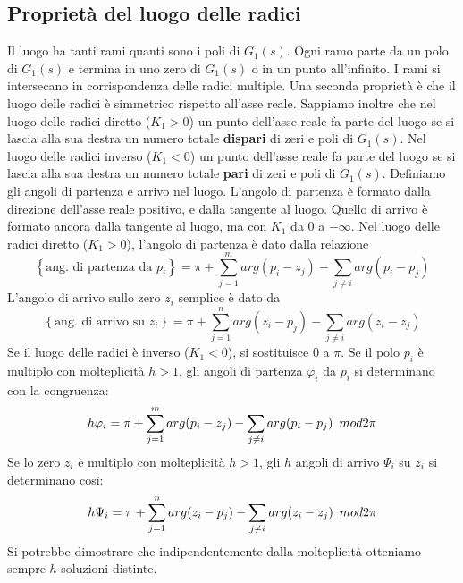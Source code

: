 \documentclass[11pt]{article}
\begin{document}
\subsection{Proprietà del luogo delle radici}
Il luogo ha tanti rami quanti sono i poli di $G_1(s)$. Ogni ramo parte da un polo di $G_1(s)$ e termina in uno zero di $G_1(s)$ o in un punto all'infinito. I rami si intersecano in corrispondenza delle radici multiple.
Una seconda proprietà è che il luogo delle radici è simmetrico rispetto all'asse reale.
Sappiamo inoltre che nel luogo delle radici diretto ($K_1>0$) un punto dell'asse reale fa parte del luogo se si lascia alla sua destra un numero totale \textbf{dispari} di zeri e poli di $G_1(s)$. Nel luogo delle radici inverso ($K_1<0$) un punto dell'asse reale fa parte del luogo se si lascia alla sua destra un numero totale \textbf{pari} di zeri e poli di $G_1(s)$.
Definiamo gli angoli di partenza e arrivo nel luogo. L'angolo di partenza è formato dalla direzione dell'asse reale positivo, e dalla tangente al luogo. Quello di arrivo è formato ancora dalla tangente al luogo, ma con $K_1$ da $0$ a $-\infty$.
Nel luogo delle radici diretto ($K_1>0$), l'angolo di partenza è dato dalla relazione
\begin{displaymath}
    \left\{\textrm{ang. di partenza da }p_i\right\}=\pi+\sum_{j=1}^m arg(p_i-z_j) - \sum_{j\neq i} arg(p_i-p_j)
\end{displaymath}
L'angolo di arrivo sullo zero $z_i$ semplice è dato da
\begin{displaymath}
    \left\{\textrm{ang. di arrivo su }z_i\right\} = \pi + \sum_{j=1}^{n} arg(z_i-p_j) - \sum_{j\neq i} arg(z_i-z_j)
\end{displaymath}
Se il luogo delle radici è inverso ($K_1<0$), si sostituisce 0 a $\pi$.
Se il polo $p_i$ è multiplo con molteplicità $h>1$, gli angoli di partenza $\varphi_i$ da $p_i$ si determinano con la congruenza:
\begin{displaymath}
    h\varphi_i = \pi+\sum_{j=1}^m arg(p_i-z_j) - \sum_{j\neq i} arg(p_i-p_j)\hspace{5px}mod2\pi
\end{displaymath}
Se lo zero $z_i$ è multiplo con molteplicità $h>1$, gli $h$ angoli di arrivo $\Psi_i$ su $z_i$ si determinano così:
\begin{displaymath}
    h\Psi_i = \pi + \sum_{j=1}^{n} arg(z_i-p_j) - \sum_{j\neq i} arg(z_i-z_j) \hspace{5px}mod2\pi
\end{displaymath}
Si potrebbe dimostrare che indipendentemente dalla molteplicità otteniamo sempre $h$ soluzioni distinte.
\end{document}
